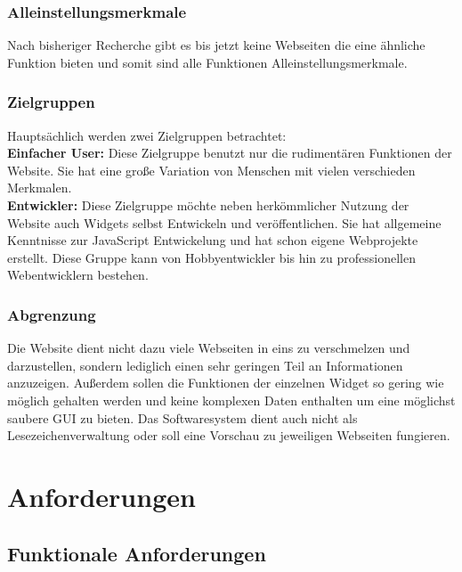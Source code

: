 		\subsubsection{Alleinstellungsmerkmale}  
			Nach bisheriger Recherche gibt es bis jetzt keine Webseiten die eine ähnliche Funktion bieten und somit sind alle Funktionen Alleinstellungsmerkmale.   
			
		\subsubsection{Zielgruppen}
			Hauptsächlich werden zwei Zielgruppen betrachtet: \\
			\textbf{Einfacher User: } Diese Zielgruppe benutzt nur die rudimentären Funktionen der Website. Sie hat eine große Variation von Menschen mit vielen verschieden Merkmalen.\\
			\textbf{Entwickler: }Diese Zielgruppe möchte neben herkömmlicher Nutzung der Website auch Widgets selbst Entwickeln und veröffentlichen. Sie hat allgemeine Kenntnisse zur JavaScript Entwickelung und hat schon eigene Webprojekte erstellt. Diese Gruppe kann von Hobbyentwickler bis hin zu professionellen Webentwicklern bestehen.   
			
		\subsubsection{Abgrenzung} 
			Die Website dient nicht dazu viele Webseiten in eins zu verschmelzen und darzustellen, sondern lediglich einen sehr geringen Teil an Informationen anzuzeigen. Außerdem sollen die Funktionen der einzelnen Widget so gering wie möglich gehalten werden und keine komplexen Daten enthalten um eine möglichst saubere GUI zu bieten. Das Softwaresystem dient auch nicht als Lesezeichenverwaltung oder soll eine Vorschau zu jeweiligen Webseiten fungieren.

\newpage			
\section{Anforderungen}
\label{anford}	
	\subsection{Funktionale Anforderungen}
